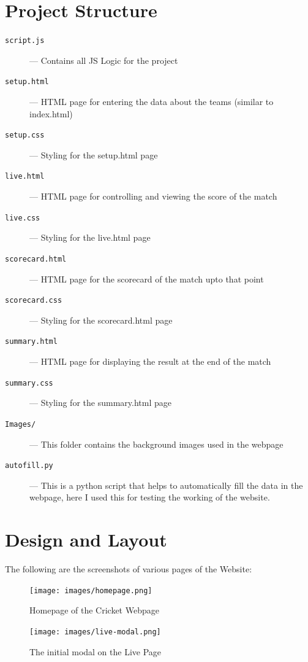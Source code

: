 \documentclass[a4paper,12pt]{article}
\begin{document}
\section{Project Structure}
\vspace{0.3cm}
\begin{description}
\item [\texttt{script.js}] --- Contains all JS Logic for the project
\item [\texttt{setup.html}] --- HTML page for entering the data about the teams (similar to index.html)
\item [\texttt{setup.css}] --- Styling for the setup.html page
\item [\texttt{live.html}] --- HTML page for controlling and viewing the score of the match
\item [\texttt{live.css}] --- Styling for the live.html page
\item [\texttt{scorecard.html}] --- HTML page for the scorecard of the match upto that point
\item [\texttt{scorecard.css}] --- Styling for the scorecard.html page 
\item [\texttt{summary.html}] --- HTML page for displaying the result at the end of the match 
\item [\texttt{summary.css}] --- Styling for the summary.html page
\item [\texttt{Images/}] --- This folder contains the background images used in the webpage
\item [\texttt{autofill.py}] --- This is a python script that helps to automatically fill the data in the \hspace*{2cm} webpage, here I used this for testing the working of the website.
\end{description}
\clearpage

\section{Design and Layout}
The following are the screenshots of various pages of the Website:
\begin{figure}[h!]
\centering
\texttt{[image: images/homepage.png]}
\caption{Homepage of the Cricket Webpage}
\label{homepage}
\end{figure}

\begin{figure}[h!]
\centering
\texttt{[image: images/live-modal.png]}
\caption{The initial modal on the Live Page}
\label{live-modal}
\end{figure}
\clearpage
\end{document}
